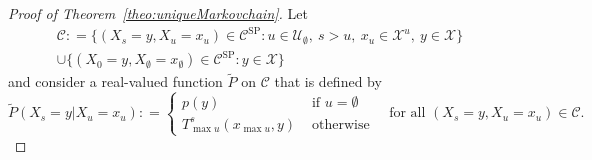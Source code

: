\documentclass[10pt,a4paper]{paper}
\theoremstyle{definition}
\newcommand{\states}{\mathcal{X}}
\newcommand{\coloneqq}{:\!=}
\begin{document}
\begin{proof}[Proof of Theorem~\ref{theo:uniqueMarkovchain}]
Let
\begin{multline*}
\mathcal{C}\coloneqq\{
(X_s=y,X_u=x_u)\in\mathcal{C}^{\mathrm{SP}}
\colon 
u\in\mathcal{U}_\emptyset,~s>u,~x_u\in\states^u,~y\in\states
\}\\
\cup
\{
(X_0=y,X_\emptyset=x_\emptyset)\in\mathcal{C}^{\mathrm{SP}}\colon y\in\states
\}
\end{multline*}
and consider a real-valued function $\tilde{P}$ on $\mathcal{C}$ that is defined by 
\begin{equation}\label{eq:theo:uniqueMarkovchain:prob_func}
\tilde{P}(X_s=y\vert X_u=x_u)
\coloneqq
\begin{cases}
p(y)&\text{~if $u=\emptyset$}\\
T_{\max u}^s(x_{\max u},y)&\text{~otherwise}
\end{cases}
\text{~~~for all $(X_s=y,X_u=x_u)\in\mathcal{C}$.}
\end{equation}



\end{proof}
\end{document}
